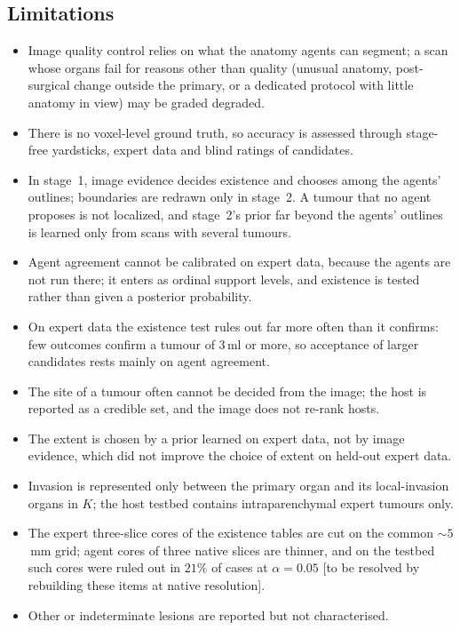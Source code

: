 \documentclass[fleqn,10pt]{olplainarticle}
\begin{document}
\subsection{Limitations}
\begin{itemize}
  \item Image quality control relies on what the anatomy agents can segment; a scan whose organs fail for reasons other than quality (unusual anatomy, post-surgical change outside the primary, or a dedicated protocol with little anatomy in view) may be graded degraded.
  \item There is no voxel-level ground truth, so accuracy is assessed through stage-free yardsticks, expert data and
  blind ratings of candidates.
  \item In stage~1, image evidence decides existence and chooses among the agents' outlines; boundaries are redrawn only in
  stage~2. A tumour that no agent proposes is not localized, and stage~2's prior far beyond the agents' outlines is learned
  only from scans with several tumours.
  \item Agent agreement cannot be calibrated on expert data, because the agents are not run there; it enters as ordinal
  support levels, and existence is tested rather than given a posterior probability.
  \item On expert data the existence test rules out far more often than it confirms: few outcomes confirm a tumour of
  $3$\,ml or more, so acceptance of larger candidates rests mainly on agent agreement.
  \item The site of a tumour often cannot be decided from the image; the host is reported as a credible set, and the image
  does not re-rank hosts.
  \item The extent is chosen by a prior learned on expert data, not by image evidence, which did not improve the choice
  of extent on held-out expert data.
  \item Invasion is represented only between the primary organ and its local-invasion organs in $K$; the host testbed
  contains intraparenchymal expert tumours only.
  \item The expert three-slice cores of the existence tables are cut on the common $\sim5$\,mm grid; agent cores of three
  native slices are thinner, and on the testbed such cores were ruled out in $21\%$ of cases at $\alpha=0.05$ [to be
  resolved by rebuilding these items at native resolution].
  \item Other or indeterminate lesions are reported but not characterised.

\end{itemize}
\end{document}
